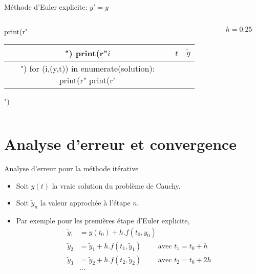\documentclass{beamer}
\begin{document}
\begin{frame}[fragile]{Méthode d'Euler explicite: $y'=y$}
    \begin{columns}

        \begin{column}{.3\textwidth}
            \begin{pycode}
                print(r"\begin{tabular}{c|c|c}")
                print(r"$i$ & $t$ & $\widetilde{y}$ \\ \hline")
                for (i,(y,t)) in enumerate(solution):
                    print(r"%
                print(r"\end{tabular}")
            \end{pycode}

        \end{column}
        \begin{column}{.7\textwidth}
            \begin{figure}
                \caption{$h=0.25$}
            \end{figure}

        \end{column}

    \end{columns}
\end{frame}


\section{Analyse d'erreur et convergence}
\begin{frame}{Analyse d'erreur pour la méthode itérative}
    \begin{itemize}
        \item Soit $y(t)$ la vraie solution du problème de Cauchy.
        \item Soit $\widetilde{y}_n$ la valeur approchée à l'étape $n$.
        \item Par exemple pour les premières étape d'Euler explicite,
              \begin{align*}
                  \widetilde{y}_1 & = y(t_0) + h.f(t_0, y_0)                                                        \\
                  \widetilde{y}_2 & = \widetilde{y}_1 + h.f(t_1, \widetilde{y}_1) \qquad \text{ avec } t_1 = t_0+h  \\
                  \widetilde{y}_3 & = \widetilde{y}_2 + h.f(t_2, \widetilde{y}_2) \qquad \text{ avec } t_2 = t_0+2h \\
                                  & \ldots
              \end{align*}
    \end{itemize}
\end{frame}
\end{document}
